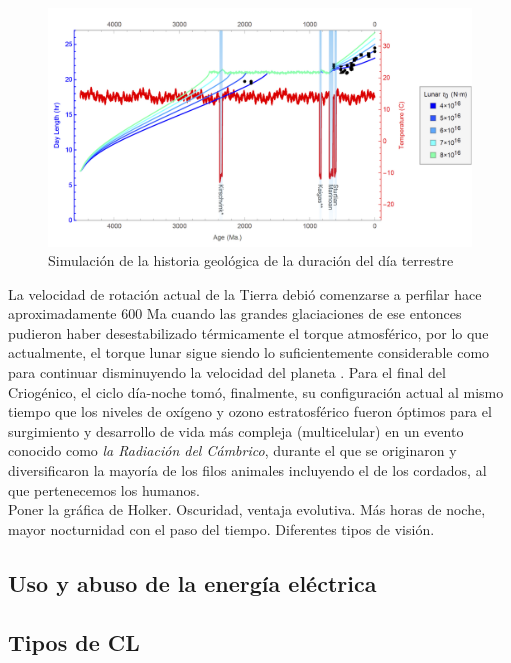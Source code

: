 \begin{figure}
  \centering
    \includegraphics[width=1\textwidth]{duraciondeldiahistorico}
  \caption{Simulación de la historia geológica de la duración del día terrestre \citep{Stevenson&Bartlett2016}}
  \label{duraciondia}
\end{figure}

La velocidad de rotación actual de la Tierra debió comenzarse a perfilar hace aproximadamente 600 Ma cuando las grandes glaciaciones de ese entonces pudieron haber desestabilizado térmicamente el torque atmosférico, por lo que actualmente, el torque lunar sigue siendo lo suficientemente considerable como para continuar disminuyendo la velocidad del planeta \citep{Stevenson&Bartlett2016}. Para el final del Criogénico, el ciclo día-noche tomó, finalmente, su configuración actual al mismo tiempo que los niveles de oxígeno y ozono estratosférico fueron óptimos para el surgimiento y desarrollo de vida más compleja (multicelular) en un evento conocido como \textit{la Radiación del Cámbrico}, durante el que se originaron y diversificaron la mayoría de los filos animales incluyendo el de los cordados, al que pertenecemos los humanos.\\

Poner la gráfica de Holker. Oscuridad, ventaja evolutiva. Más horas de noche, mayor nocturnidad con el paso del tiempo.
Diferentes tipos de visión.

\subsection{Uso y abuso de la energía eléctrica} 

\subsection{Tipos de CL} 

